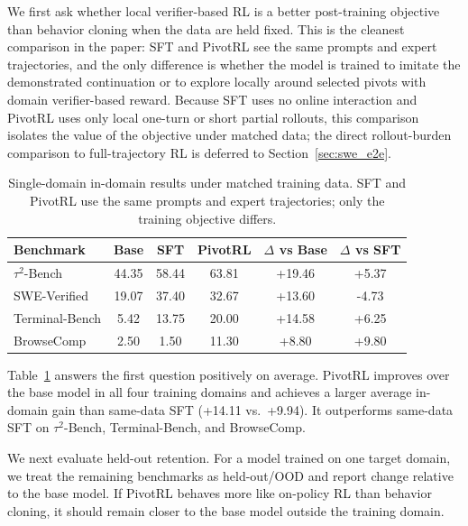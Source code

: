 We first ask whether local verifier-based RL is a better post-training objective than behavior cloning when the data are held fixed. This is the cleanest comparison in the paper: SFT and PivotRL see the same prompts and expert trajectories, and the only difference is whether the model is trained to imitate the demonstrated continuation or to explore locally around selected pivots with domain verifier-based reward. Because SFT uses no online interaction and PivotRL uses only local one-turn or short partial rollouts, this comparison isolates the value of the objective under matched data; the direct rollout-burden comparison to full-trajectory RL is deferred to Section~\ref{sec:swe_e2e}.

\begin{table}[t]
\centering
\small
\begin{tabular}{lccccc}
\toprule
\textbf{Benchmark} & \textbf{Base} & \textbf{SFT} & \textbf{PivotRL} & \textbf{$\Delta$ vs Base} & \textbf{$\Delta$ vs SFT} \\
\midrule
$\tau^2$-Bench   & 44.35 & 58.44 & 63.81 & +19.46 & +5.37 \\
SWE-Verified     & 19.07 & 37.40 & 32.67 & +13.60 & -4.73 \\
Terminal-Bench   & 5.42  & 13.75 & 20.00 & +14.58 & +6.25 \\
BrowseComp       & 2.50  & 1.50  & 11.30 & +8.80  & +9.80 \\
\bottomrule
\end{tabular}
\caption{
Single-domain in-domain results under matched training data.
SFT and PivotRL use the same prompts and expert trajectories; only the training objective differs.
}
\label{tab:single_domain_main_results}
\end{table}

Table~\ref{tab:single_domain_main_results} answers the first question positively on average. PivotRL improves over the base model in all four training domains and achieves a larger average in-domain gain than same-data SFT (+14.11 vs.\ +9.94). It outperforms same-data SFT on $\tau^2$-Bench, Terminal-Bench, and BrowseComp.

We next evaluate held-out retention. For a model trained on one target domain, we treat the remaining benchmarks as held-out/OOD and report change relative to the base model. If PivotRL behaves more like on-policy RL than behavior cloning, it should remain closer to the base model outside the training domain.


